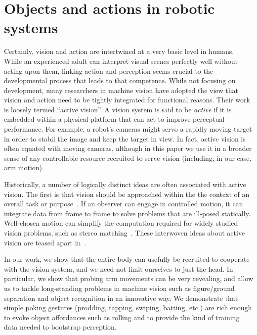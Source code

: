 \section{Objects and actions in robotic systems}

Certainly, vision and action are intertwined at a very basic level in
humans.  While an experienced adult can interpret visual scenes
perfectly well without acting upon them, linking action and perception
seems crucial to the developmental process that leads to that
competence.  While not focusing on development, many researchers in
machine vision have adopted the view that vision and action need to be
tightly integrated for functional reasons.  Their work is loosely
termed ``active vision''.
%
A vision system is said to be {\em active} if it is embedded within a
physical platform that can act to improve perceptual performance.  For
example, a robot's cameras might servo a rapidly moving target in order to
stabil\ize{} the image and keep the target in view.  In fact, active
vision is often equated with moving cameras, although in this paper we
use it in a broader sense of any controllable resource recruited to
serve vision (including, in our case, arm motion).

Historically, a number of logically distinct ideas are often
associated with active vision.  The first is that vision should be
approached within the the context of an overall task or
purpose~\cite{aloimonos87active}.  If an observer can engage in
controlled motion, it can integrate data from frame to frame to solve
problems that are ill-posed statically.  Well-chosen motion can
simplify the computation required for widely studied vision problems,
such as stereo matching~\cite{bajcsy88active,ballard91animate}.  These
interwoven ideas about active vision are teased apart
in~\cite{tarr94computational}.  

In our work, we show that the entire body can usefully be recruited to
cooperate with the vision system, and we need not limit ourselves to
just the head.  In particular, we show that probing arm movements
can be very revealing, and allow us to tackle long-standing problems 
in machine vision 
\ifrevised
such as figure/ground separation and object recognition
\fi
in an innovative way.
We demonstrate that simple poking gestures
(prodding, tapping, swiping, batting, etc.) are rich enough 
to evoke object affordances such as rolling and to provide
the kind of training data needed to bootstrap perception.

